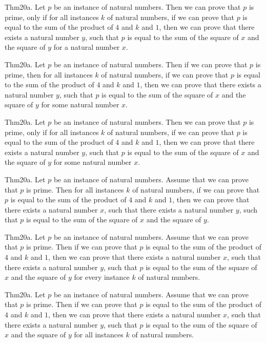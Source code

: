 \documentclass{article}
\begin{document}
Thm20a. Let $p$ be an instance of natural numbers. Then we can prove that $p$ is prime, only if for all instances $k$ of natural numbers, if we can prove that $p$ is equal to the sum of the product of $4$ and $k$ and $1$, then we can prove that there exists a natural number $y$, such that $p$ is equal to the sum of the square of $x$ and the square of $y$ for a natural number $x$.

Thm20a. Let $p$ be an instance of natural numbers. Then if we can prove that $p$ is prime, then for all instances $k$ of natural numbers, if we can prove that $p$ is equal to the sum of the product of $4$ and $k$ and $1$, then we can prove that there exists a natural number $y$, such that $p$ is equal to the sum of the square of $x$ and the square of $y$ for some natural number $x$.

Thm20a. Let $p$ be an instance of natural numbers. Then we can prove that $p$ is prime, only if for all instances $k$ of natural numbers, if we can prove that $p$ is equal to the sum of the product of $4$ and $k$ and $1$, then we can prove that there exists a natural number $y$, such that $p$ is equal to the sum of the square of $x$ and the square of $y$ for some natural number $x$.

Thm20a. Let $p$ be an instance of natural numbers. Assume that we can prove that $p$ is prime. Then for all instances $k$ of natural numbers, if we can prove that $p$ is equal to the sum of the product of $4$ and $k$ and $1$, then we can prove that there exists a natural number $x$, such that there exists a natural number $y$, such that $p$ is equal to the sum of the square of $x$ and the square of $y$.

Thm20a. Let $p$ be an instance of natural numbers. Assume that we can prove that $p$ is prime. Then if we can prove that $p$ is equal to the sum of the product of $4$ and $k$ and $1$, then we can prove that there exists a natural number $x$, such that there exists a natural number $y$, such that $p$ is equal to the sum of the square of $x$ and the square of $y$ for every instance $k$ of natural numbers.

Thm20a. Let $p$ be an instance of natural numbers. Assume that we can prove that $p$ is prime. Then if we can prove that $p$ is equal to the sum of the product of $4$ and $k$ and $1$, then we can prove that there exists a natural number $x$, such that there exists a natural number $y$, such that $p$ is equal to the sum of the square of $x$ and the square of $y$ for all instances $k$ of natural numbers.
\end{document}
